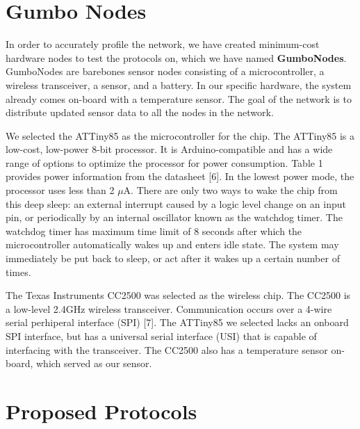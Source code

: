 \section{Gumbo Nodes}
\label{section:gumbo_node}

In order to accurately profile the network, we have created minimum-cost hardware nodes to test the protocols on, which we have named
\textbf{GumboNodes}.  GumboNodes are barebones sensor nodes consisting of a microcontroller, a wireless transceiver, a sensor, and a battery. In our specific hardware, the system already comes on-board with a temperature sensor.  The goal of the network is to distribute updated sensor data to all the nodes in the network.

We selected the ATTiny85 as the microcontroller for the chip. The ATTiny85 is a low-cost, low-power 8-bit processor. It is Arduino-compatible and has a wide range of options to optimize the processor for power consumption. Table 1 provides power information from the datasheet [6]. In the lowest power mode, the processor uses less than 2 $\mu$A. There are only two ways to wake the chip from this deep sleep: an external interrupt caused by a logic level change on an input pin, or periodically by an internal oscillator known as the watchdog timer. The watchdog timer has maximum time limit of 8 seconds after which the microcontroller automatically wakes up and enters idle state. The system may immediately be put back to sleep, or act after it wakes up a certain number of times.

The Texas Instruments CC2500 was selected as the wireless chip. The CC2500 is a low-level 2.4GHz wireless transceiver. Communication occurs over a 4-wire serial perhiperal interface (SPI) [7]. The ATTiny85 we selected lacks an onboard SPI interface, but has a universal serial interface (USI) that is capable of interfacing with the transceiver. The CC2500 also has a temperature sensor on-board, which served as our sensor. 


\section{Proposed Protocols}

